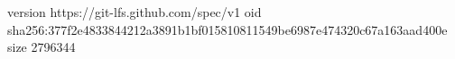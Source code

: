version https://git-lfs.github.com/spec/v1
oid sha256:377f2e4833844212a3891b1bf015810811549be6987e474320c67a163aad400e
size 2796344
